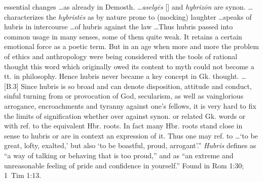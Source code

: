 essential changes \ldots as already in Demosth. \ldots \emph{aselgēs} [] and \emph{hybrizōn} are synon. \ldots characterizes the \emph{hybristēs} as by nature prone to (mocking) laughter \ldots speaks of hubris in intercourse \ldots of hubris against the law \ldots Thus hubris passed into common usage in many senses, some of them quite weak. It retains a certain emotional force as a poetic term. But in an age when more and more the problem of ethics and anthropology were being considered with the tools of rational thought this word which originally owed its content to myth could not become a tt. in philosophy. Hence hubris never became a key concept in Gk. thought. \ldots [B.3] Since hubris is so broad and can denote disposition, attitude and conduct, sinful turning from or provocation of God, secularism, as well as vainglorious arrogance, encroachments and tyranny against one's fellows, it is very hard to fix the limits of signification whether over against synon. or related Gk. words or with ref. to the equivalent Hbr. roots. In fact many Hbr. roots stand close in sense to hubris or are in context an expression of it. Thus one may ref. to \ldots `to be great, lofty, exalted,' but also `to be boastful, proud, arrogant'.''
 \emph{Hubris} defines as ``a way of talking or behaving that is too proud,'' and as ``an extreme and unreasonable feeling of pride and confidence in yourself.''
Found in Rom 1:30; 1~Tim 1:13.

